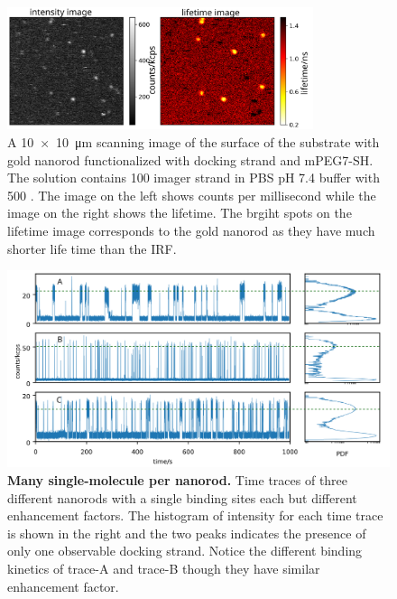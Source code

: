 \begin{figure}[ht]
  \centering
  \includegraphics[width=0.8\textwidth]{trans_int_lt_img}
  \makeatletter
  \renewcommand{\fnum@figure}{\figurename~S\thefigure}
  \makeatother
  \caption{A \SI[product-units=power]{10x10}{\um} scanning image of the surface of the substrate with gold nanorod functionalized with docking strand and mPEG7-SH.
  The solution contains \SI{100}{\nM} imager strand in PBS pH 7.4 buffer with \SI{500}{\mM} .
  The image on the left shows counts per millisecond while the image on the right shows the lifetime.
  The brgiht spots on the lifetime image corresponds to the gold nanorod as they have much shorter life time than the IRF.}
  \label{SIfig:trans_int_lt}
\end{figure}
\begin{figure}[ht]
  \centering
  \includegraphics[width=\textwidth]{bleaching_free_longtrace}
  \makeatletter
  \renewcommand{\fnum@figure}{\figurename~S\thefigure}
  \makeatother
  \caption{\textbf{Many single-molecule per nanorod.} Time traces of three different nanorods with a single binding sites each but different enhancement factors.
  The histogram of intensity for each time trace is shown in the right and the two peaks indicates the presence of only one observable docking strand.
  Notice the different binding kinetics of trace-A and trace-B though they have similar enhancement factor.}
  \label{SIfig:bleaching_free_longtrace}
\end{figure}

